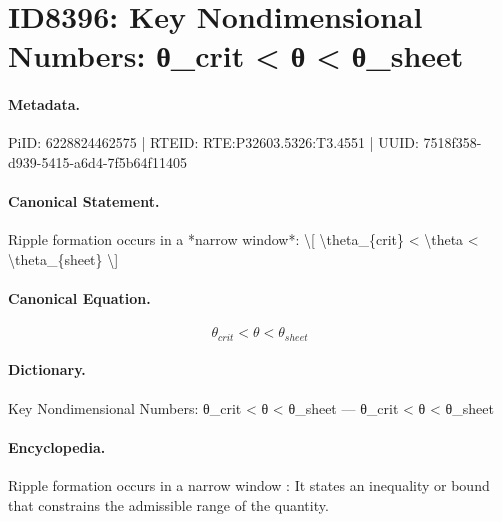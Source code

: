 \section*{ID8396: Key Nondimensional Numbers: θ\_crit < θ < θ\_sheet}
\paragraph{Metadata.}
PiID: 6228824462575 | RTEID: RTE:P32603.5326:T3.4551 | UUID: 7518f358-d939-5415-a6d4-7f5b64f11405

\paragraph{Canonical Statement.}
Ripple formation occurs in a *narrow window*: \textbackslash{}[ \textbackslash{}theta\_\{crit\} < \textbackslash{}theta < \textbackslash{}theta\_\{sheet\} \textbackslash{}]

\paragraph{Canonical Equation.}
\[
\theta_{crit} < \theta < \theta_{sheet}
\]

\paragraph{Dictionary.}
Key Nondimensional Numbers: θ\_crit < θ < θ\_sheet — θ\_crit < θ < θ\_sheet

\paragraph{Encyclopedia.}
Ripple formation occurs in a narrow window : It states an inequality or bound that constrains the admissible range of the quantity.
